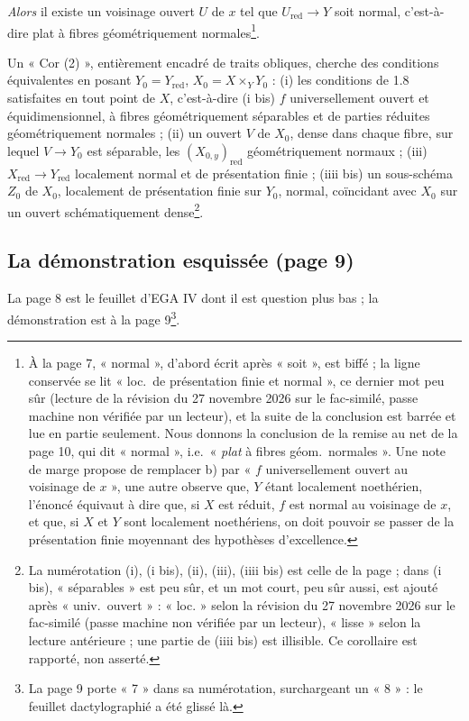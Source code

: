 \documentclass[11pt,a4paper]{article}
\begin{document}
\emph{Alors} il existe un voisinage ouvert $U$ de $x$ tel que
$U_{\mathrm{red}} \to Y$ soit normal, c'est-à-dire plat à fibres
géométriquement normales\footnote{À la page 7, « normal », d'abord écrit après
« soit », est biffé ; la ligne conservée se lit « loc.\ de présentation finie et
normal », ce dernier mot peu sûr (lecture de la révision du 27 novembre 2026
sur le fac-similé, passe machine non vérifiée par un lecteur), et la suite de
la conclusion est barrée et lue en partie seulement. Nous donnons la
conclusion de la remise au net de la page 10, qui dit « normal », i.e.\
« \emph{plat} à fibres géom.\ normales ». Une note de marge propose de
remplacer b) par « $f$ universellement ouvert au voisinage de $x$ », une autre
observe que, $Y$ étant localement noethérien, l'énoncé équivaut à dire que,
si $X$ est réduit, $f$ est normal au voisinage de $x$, et que, si $X$ et $Y$
sont localement noethériens, on doit pouvoir se passer de la présentation
finie moyennant des hypothèses d'excellence.}.

Un « Cor (2) », entièrement encadré de traits obliques, cherche des conditions
équivalentes en posant $Y_0 = Y_{\mathrm{red}}$, $X_0 = X \times_Y Y_0$ :
(i) les conditions de 1.8 satisfaites en tout point de $X$, c'est-à-dire
(i bis) $f$ universellement ouvert et équidimensionnel, à fibres
géométriquement séparables et de parties réduites géométriquement normales ;
(ii) un ouvert $V$ de
$X_0$, dense dans chaque fibre, sur lequel $V \to Y_0$ est séparable, les
$(X_{0,y})_{\mathrm{red}}$ géométriquement normaux ; (iii) $X_{\mathrm{red}} \to Y_{\mathrm{red}}$
localement normal et de présentation finie ; (iiii bis) un
sous-schéma $Z_0$ de $X_0$, localement de présentation finie sur $Y_0$, normal,
coïncidant avec $X_0$ sur un ouvert schématiquement dense\footnote{La
numérotation (i), (i bis), (ii), (iii), (iiii bis) est celle de la page ;
dans (i bis), « séparables » est peu sûr, et un mot court, peu sûr aussi, est
ajouté après « univ.\ ouvert » : « loc. » selon la révision du 27 novembre
2026 sur le fac-similé (passe machine non vérifiée par un lecteur), « lisse »
selon la lecture antérieure ; une partie de (iiii bis) est
illisible. Ce corollaire est rapporté, non asserté.}.

\subsection*{La démonstration esquissée (page 9)}

La page 8 est le feuillet d'EGA IV dont il est question plus bas ; la
démonstration est à la page 9\footnote{La page 9 porte « 7 » dans sa
numérotation, surchargeant un « 8 » : le feuillet dactylographié a été
glissé là.}.
\end{document}
